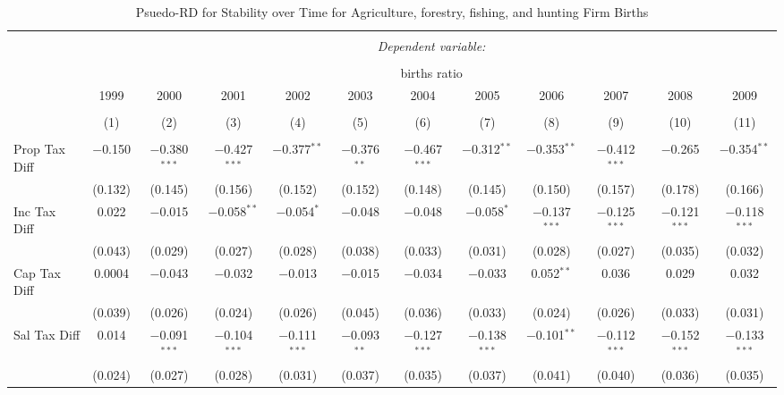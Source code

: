 
\begin{table}[!htbp] \centering 
  \caption{Psuedo-RD for Stability over Time for  Agriculture, forestry, fishing, and hunting Firm Births} 
  \label{11year} 
\small 
\begin{tabular}{@{\extracolsep{5pt}}lccccccccccc} 
\\[-1.8ex]\hline 
\hline \\[-1.8ex] 
 & \multicolumn{11}{c}{\textit{Dependent variable:}} \\ 
\cline{2-12} 
\\[-1.8ex] & \multicolumn{11}{c}{births ratio} \\ 
 & 1999 & 2000 & 2001 & 2002 & 2003 & 2004 & 2005 & 2006 & 2007 & 2008 & 2009 \\ 
\\[-1.8ex] & (1) & (2) & (3) & (4) & (5) & (6) & (7) & (8) & (9) & (10) & (11)\\ 
\hline \\[-1.8ex] 
 Prop Tax Diff & $-$0.150 & $-$0.380$^{***}$ & $-$0.427$^{***}$ & $-$0.377$^{**}$ & $-$0.376$^{**}$ & $-$0.467$^{***}$ & $-$0.312$^{**}$ & $-$0.353$^{**}$ & $-$0.412$^{***}$ & $-$0.265 & $-$0.354$^{**}$ \\ 
  & (0.132) & (0.145) & (0.156) & (0.152) & (0.152) & (0.148) & (0.145) & (0.150) & (0.157) & (0.178) & (0.166) \\ 
  Inc Tax Diff & 0.022 & $-$0.015 & $-$0.058$^{**}$ & $-$0.054$^{*}$ & $-$0.048 & $-$0.048 & $-$0.058$^{*}$ & $-$0.137$^{***}$ & $-$0.125$^{***}$ & $-$0.121$^{***}$ & $-$0.118$^{***}$ \\ 
  & (0.043) & (0.029) & (0.027) & (0.028) & (0.038) & (0.033) & (0.031) & (0.028) & (0.027) & (0.035) & (0.032) \\ 
  Cap Tax Diff & 0.0004 & $-$0.043 & $-$0.032 & $-$0.013 & $-$0.015 & $-$0.034 & $-$0.033 & 0.052$^{**}$ & 0.036 & 0.029 & 0.032 \\ 
  & (0.039) & (0.026) & (0.024) & (0.026) & (0.045) & (0.036) & (0.033) & (0.024) & (0.026) & (0.033) & (0.031) \\ 
  Sal Tax Diff & 0.014 & $-$0.091$^{***}$ & $-$0.104$^{***}$ & $-$0.111$^{***}$ & $-$0.093$^{**}$ & $-$0.127$^{***}$ & $-$0.138$^{***}$ & $-$0.101$^{**}$ & $-$0.112$^{***}$ & $-$0.152$^{***}$ & $-$0.133$^{***}$ \\ 
  & (0.024) & (0.027) & (0.028) & (0.031) & (0.037) & (0.035) & (0.037) & (0.041) & (0.040) & (0.036) & (0.035) \\ 

\end{tabular}
\end{table}
